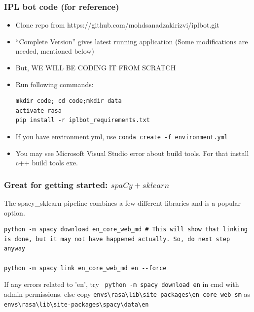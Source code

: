  \begin{frame}[fragile]\frametitle{IPL bot code (for reference)}
\begin{itemize}
\item Clone repo from https://github.com/mohdsanadzakirizvi/iplbot.git
\item  ``Complete Version'' gives latest running application (Some modifications are needed, mentioned below)
\item But, WE WILL BE CODING IT FROM SCRATCH
\item Run following commands:

\begin{lstlisting}
mkdir code; cd code;mkdir data
activate rasa
pip install -r iplbot_requirements.txt
\end{lstlisting}
\item If you have environment.yml, use \lstinline|conda create -f environment.yml|
\item You may see Microsoft Visual Studio error about build tools. For that install c++ build tools exe.

\end{itemize}
\end{frame}



 \begin{frame}[fragile]\frametitle{Great for getting started: $spaCy + sklearn$}
 The spacy\_sklearn pipeline combines a few different libraries and is a popular option.

\begin{lstlisting}
python -m spacy download en_core_web_md # This will show that linking is done, but it may not have happened actually. So, do next step anyway

python -m spacy link en_core_web_md en --force
\end{lstlisting}

If any errors related to 'en', try \lstinline| python -m spacy download en| in cmd with admin permissions.
else copy \lstinline|envs\rasa\lib\site-packages\en_core_web_sm| as \lstinline|envs\rasa\lib\site-packages\spacy\data\en|

\end{frame}

